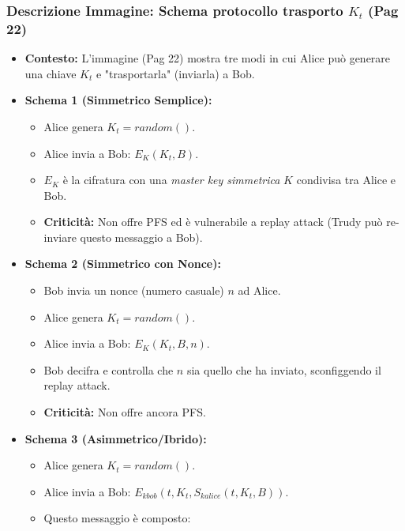 \documentclass[../main.tex]{subfiles}
\begin{document}
\begin{description}
    \subsubsection*{Descrizione Immagine: Schema protocollo trasporto $K_t$ (Pag 22)}
    \begin{itemize}
        \item \textbf{Contesto:} L'immagine (Pag 22) mostra tre modi in cui Alice può generare una chiave $K_t$ e "trasportarla" (inviarla) a Bob.
        \item \textbf{Schema 1 (Simmetrico Semplice):}
              \begin{itemize}
                  \item Alice genera $K_t = random()$.
                  \item Alice invia a Bob: $E_K(K_t, B)$.
                  \item $E_K$ è la cifratura con una \emph{master key simmetrica} $K$ condivisa tra Alice e Bob.
                  \item \textbf{Criticità:} Non offre PFS ed è vulnerabile a replay attack (Trudy può re-inviare questo messaggio a Bob).
              \end{itemize}
        \item \textbf{Schema 2 (Simmetrico con Nonce):}
              \begin{itemize}
                  \item Bob invia un nonce (numero casuale) $n$ ad Alice.
                  \item Alice genera $K_t = random()$.
                  \item Alice invia a Bob: $E_K(K_t, B, n)$.
                  \item Bob decifra e controlla che $n$ sia quello che ha inviato, sconfiggendo il replay attack.
                  \item \textbf{Criticità:} Non offre ancora PFS.
              \end{itemize}
        \item \textbf{Schema 3 (Asimmetrico/Ibrido):}
              \begin{itemize}
                  \item Alice genera $K_t = random()$.
                  \item Alice invia a Bob: $E_{kbob}(t, K_t, S_{kalice}(t, K_t, B))$.
                  \item Questo messaggio è composto:
                        \begin{itemize}

\end{itemize}
\end{itemize}
\end{itemize}
\end{description}
\end{document}
